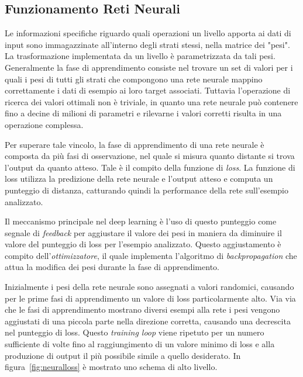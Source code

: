\subsection{Funzionamento Reti Neurali}
Le informazioni specifiche riguardo quali operazioni un livello apporta ai dati di input sono immagazzinate all'interno degli strati stessi, nella matrice dei "pesi". La trasformazione implementata da un livello è parametrizzata da tali pesi. Generalmente la fase di apprendimento consiste nel trovare un set di valori per i quali i pesi di tutti gli strati che compongono una rete neurale mappino correttamente i dati di esempio ai loro target associati.
Tuttavia l'operazione di ricerca dei valori ottimali non è triviale, in quanto una rete neurale può contenere fino a decine di milioni di parametri e rilevarne i valori corretti risulta in una operazione complessa.

Per superare tale vincolo, la fase di apprendimento di una rete neurale è composta da più fasi di osservazione, nel quale si misura quanto distante si trova l'output da quanto atteso. Tale è il compito della funzione di \textit{loss}. La funzione di loss utilizza la predizione della rete neurale e l'output atteso e computa un punteggio di distanza, catturando quindi la performance della rete sull'esempio analizzato.

Il meccanismo principale nel deep learning è l'uso di questo punteggio come segnale di \textit{feedback} per aggiustare il valore dei pesi in maniera da diminuire il valore del punteggio di loss per l'esempio analizzato. Questo aggiustamento è compito dell'\textit{ottimizzatore}, il quale implementa l'algoritmo di \textit{backpropagation} che attua la modifica dei pesi durante la fase di apprendimento.

Inizialmente i pesi della rete neurale sono assegnati a valori randomici, causando per le prime fasi di apprendimento un valore di loss particolarmente alto. Via via che le fasi di apprendimento mostrano diversi esempi alla rete i pesi vengono aggiustati di una piccola parte nella direzione corretta, causando una decrescita nel punteggio di loss. Questo \textit{training loop} viene ripetuto per un numero sufficiente di volte fino al raggiungimento di un valore minimo di loss e alla produzione di output il più possibile simile a quello desiderato. In figura~\ref{fig:neuralloss} è mostrato uno schema di alto livello.

